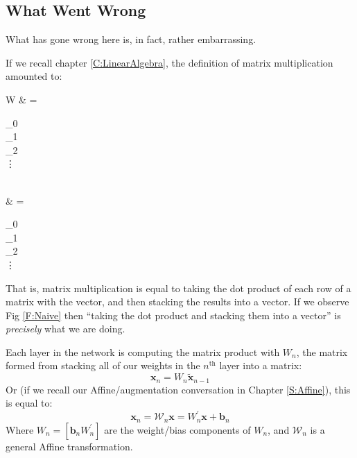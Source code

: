 \documentclass[a4paper,openany,11pt]{book}
\renewcommand\vec[1]{\boldsymbol{\mathbf{#1}}}
\begin{document}
				\subsection{What Went Wrong}

					What has gone wrong here is, in fact, rather embarrassing.
					
					If we recall chapter \ref{C:LinearAlgebra}, the definition of matrix multiplication amounted to:
					\begin{spalign}
						W\vec{x} & = \begin{bmatrix}
							\vec{w}_0 \\ \vec{w}_1 \\ \vec{w}_2 \\ \vdots 
						\end{bmatrix} \vec{x}
						\\
						& = \begin{pmatrix}
							\vec{w}_0 \cdot \vec{x} \\ \vec{w}_1 \cdot \vec{x} \\ \vec{w}_2 \cdot \vec{x} \\ \vdots
						\end{pmatrix}
					\end{spalign}
					That is, matrix multiplication is equal to taking the dot product of each row of a matrix with the vector, and then stacking the results into a vector. If we observe Fig \ref{F:Naive} then ``taking the dot product and stacking them into a vector'' is \textit{precisely} what we are doing. 

					Each layer in the network is computing the matrix product with $W_n$, the matrix formed from stacking all of our weights in the $n^\text{th}$ layer into a matrix:
					\begin{equation}
						\vec{x}_n = W_n \tilde{\vec{x}}_{n-1}
					\end{equation}
					Or (if we recall our Affine/augmentation conversation in Chapter \ref{S:Affine}), this is equal to:
					\begin{equation}
						\vec{x}_n = \mathcal{W}_n\vec{x} = W_n^\prime \vec{x} + \vec{b}_n
					\end{equation}				
					Where $W_n = [\vec{b}_n W_n^\prime]$ are the weight/bias components of $W_n$, and $\mathcal{W}_n$ is a general Affine transformation. 
					
\end{document}
